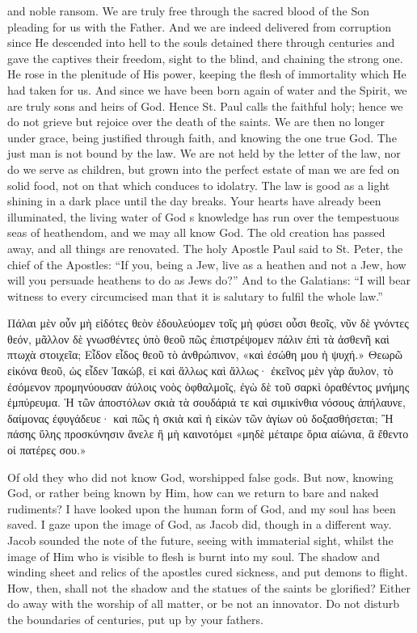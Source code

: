 \documentclass[10pt]{book}
\newcommand{\switchGreek}[1][]{\selectlanguage{polutonikogreek} \switchcolumn*[#1]}
\newcommand{\switchEnglish}{\selectlanguage{english} \switchcolumn}
\begin{document}
\begin{paracol}{2}
and noble ransom. We are truly free through 
the sacred blood of the Son pleading for us 
with the Father. And we are indeed delivered 
from corruption since He descended into hell 
to the souls detained there through centuries 
and gave the captives their freedom, sight to 
the blind, and chaining the strong one. He 
rose in the plenitude of His power, keeping the 
flesh of immortality which He had taken for 
us. And since we have been born again of 
water and the Spirit, we are truly sons and 
heirs of God. Hence St. Paul calls the faithful 
holy; hence we do not grieve but rejoice over 
the death of the saints. We are then no 
longer under grace, being justified through 
faith, and knowing the one true God. The 
just man is not bound by the law. We are 
not held by the letter of the law, nor do we 
serve as children, but grown into the perfect 
estate of man we are fed on solid food, not 
on that which conduces to idolatry. The law 
is good as a light shining in a dark place 
until the day breaks. Your hearts have already 
been illuminated, the living water of God s 
knowledge has run over the tempestuous seas 
of heathendom, and we may all know God. 
The old creation has passed away, and all 
things are renovated. The holy Apostle Paul 
said to St. Peter, the chief of the Apostles:
``If you, being a Jew, live as a heathen and 
not a Jew, how will you persuade heathens 
to do as Jews do?'' And to the Galatians: 
``I will bear witness to every circumcised man 
that it is salutary to fulfil the whole law.''

\switchGreek

Πάλαι μὲν οὖν μὴ εἰδότες θεὸν ἐδουλεύομεν τοῖς μὴ φύσει οὖσι θεοῖς, νῦν δὲ γνόντες θεόν, μᾶλλον δὲ γνωσθέντες ὑπὸ θεοῦ πῶς ἐπιστρέψομεν πάλιν ἐπὶ τὰ ἀσθενῆ καὶ πτωχὰ στοιχεῖα; Εἶδον εἶδος θεοῦ τὸ ἀνθρώπινον, «καὶ ἐσώθη μου ἡ ψυχή.»
Θεωρῶ εἰκόνα θεοῦ, ὡς εἶδεν Ἰακώβ, εἰ καὶ ἄλλως καὶ ἄλλως· ἐκεῖνος μὲν γὰρ ἄυλον, τὸ ἐσόμενον προμηνύουσαν ἀύλοις νοὸς ὀφθαλμοῖς, ἐγὼ δὲ τοῦ σαρκὶ ὁραθέντος μνήμης ἐμπύρευμα.
Ἡ τῶν ἀποστόλων σκιὰ τὰ σουδάριά τε καὶ σιμικίνθια νόσους ἀπήλαυνε, δαίμονας ἐφυγάδευε· καὶ πῶς ἡ σκιὰ καὶ ἡ εἰκὼν τῶν ἁγίων οὐ δοξασθήσεται; Ἢ πάσης ὕλης προσκύνησιν ἄνελε ἢ μὴ καινοτόμει «μηδὲ μέταιρε ὅρια αἰώνια, ἃ ἔθεντο οἱ πατέρες σου.»

\switchEnglish

Of old they who did not know God, worshipped false gods. But now, knowing God,
or rather being known by Him, how can we 
return to bare and naked rudiments? I have 
looked upon the human form of God, and my 
soul has been saved. I gaze upon the image 
of God, as Jacob did, though in a different 
way. Jacob sounded the note of the future, 
seeing with immaterial sight, whilst the image 
of Him who is visible to flesh is burnt into my 
soul. The shadow and winding sheet and relics 
of the apostles cured sickness, and put demons 
to flight. How, then, shall not the shadow 
and the statues of the saints be glorified? 
Either do away with the worship of all matter, 
or be not an innovator. Do not disturb the 
boundaries of centuries, put up by your fathers. 


\end{paracol}
\end{document}
